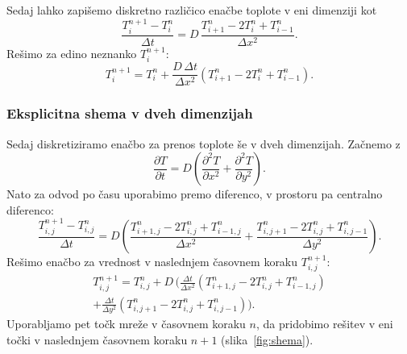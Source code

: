 \documentclass[a4paper,11pt]{article}
\begin{document}
	Sedaj lahko zapišemo diskretno različico enačbe toplote v eni dimenziji kot
	\begin{equation}
		\frac{T^{n+1}_i - T^n_i}{\Delta t} = D\,\frac{T^n_{i+1} - 2T^n_i + T^n_{i-1}}{\Delta x^2}.
	\end{equation}
	Rešimo za edino neznanko $T^{n+1}_i$:
	\begin{equation}
		T^{n+1}_i = T^n_i + \frac{D\,\Delta t}{\Delta x^2}\left(T^n_{i+1} - 2T^n_i + T^n_{i-1}\right).
	\end{equation}
	
	\subsubsection{Eksplicitna shema v dveh dimenzijah}
	
	Sedaj diskretiziramo enačbo za prenos toplote še v dveh dimenzijah. Začnemo z
	\begin{equation}
		\frac{\partial T}{\partial t} = D\left(\frac{\partial^2 T}{\partial x^2} + \frac{\partial^2 T}{\partial y^2}\right).
	\end{equation}
	Nato za odvod po času uporabimo premo diferenco, v prostoru pa centralno diferenco:
	\begin{equation}
		\frac{T^{n+1}_{i,j} - T^n_{i,j}}{\Delta t} = D\left(\frac{T^n_{i+1,j} - 2T^n_{i,j} + T^n_{i-1,j}}{\Delta x^2} + \frac{T^n_{i,j+1} - 2T^n_{i,j} + T^n_{i,j-1}}{\Delta y^2}\right).
	\end{equation}
	Rešimo enačbo za vrednost v naslednjem časovnem koraku $T^{n+1}_{i,j}$:
	\begin{multline}
		T^{n+1}_{i,j} = T^n_{i,j} + D\,\Bigg(\frac{\Delta t}{\Delta x^2}\left(T^n_{i+1,j} - 2T^n_{i,j} + T^n_{i-1,j}\right) \\
		+ \frac{\Delta t}{\Delta y^2}\left(T^n_{i,j+1} - 2T^n_{i,j} + T^n_{i,j-1}\right)\Bigg).
		\label{eq:shema2d}
	\end{multline}
	Uporabljamo pet točk mreže v časovnem koraku $n$, da pridobimo rešitev v eni točki v naslednjem časovnem koraku $n + 1$ (slika~\ref{fig:shema}).
	
\end{document}
